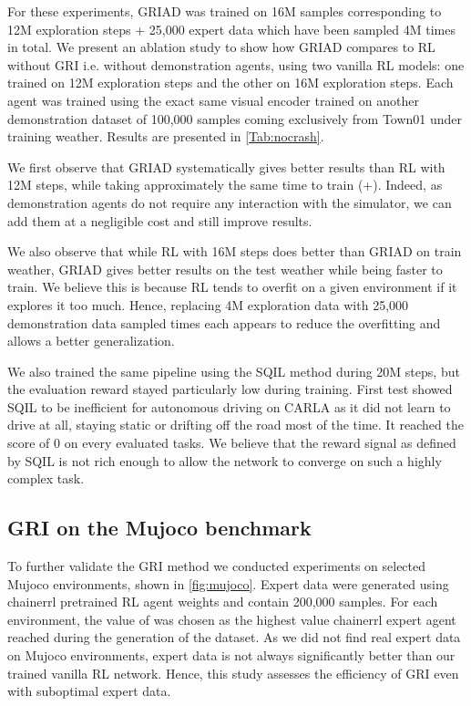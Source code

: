 \documentclass[letterpaper, 10 pt, conference]{ieeeconf}
\begin{document}
For these experiments, GRIAD was trained on 16M samples corresponding to 12M exploration steps + 25,000 expert data which have been sampled 4M times in total. We present an ablation study to show how GRIAD compares to RL without GRI i.e. without demonstration agents, using two vanilla RL models: one trained on 12M exploration steps and the other on 16M exploration steps. Each agent was trained using the exact same visual encoder trained on another demonstration dataset of 100,000 samples coming exclusively from Town01 under training weather. Results are presented in \cref{Tab:nocrash}.

We first observe that GRIAD systematically gives better results than RL with 12M steps, while taking approximately the same time to train (+). Indeed, as demonstration agents do not require any interaction with the simulator, we can add them at a negligible cost and still improve results.

We also observe that while RL with 16M steps does better than GRIAD on train weather, GRIAD gives better results on the test weather while being  faster to train. We believe this is because RL tends to overfit on a given environment if it explores it too much. Hence, replacing 4M exploration data with 25,000 demonstration data sampled  times each appears to reduce the overfitting and allows a better generalization.



We also trained the same pipeline using the SQIL method during 20M steps, but the evaluation reward stayed particularly low during training. First test showed SQIL to be inefficient for autonomous driving on CARLA as it did not learn to drive at all, staying static or drifting off the road most of the time. It reached the score of 0 on every evaluated tasks. We believe that the reward signal as defined by SQIL is not rich enough to allow the network to converge on such a highly complex task.



\subsection{GRI on the Mujoco benchmark}
\label{sec:gri-mujoco}

To further validate the GRI method we conducted experiments on selected Mujoco \cite{mujoco} environments, shown in \cref{fig:mujoco}. Expert data were generated using chainerrl \cite{chainerrl} pretrained RL agent weights and contain 200,000 samples. For each environment, the value of  was chosen as the highest value chainerrl expert agent reached during the generation of the dataset. As we did not find real expert data on Mujoco environments, expert data is not always significantly better than our trained vanilla RL network. Hence, this study assesses the efficiency of GRI even with suboptimal expert data.
\end{document}
